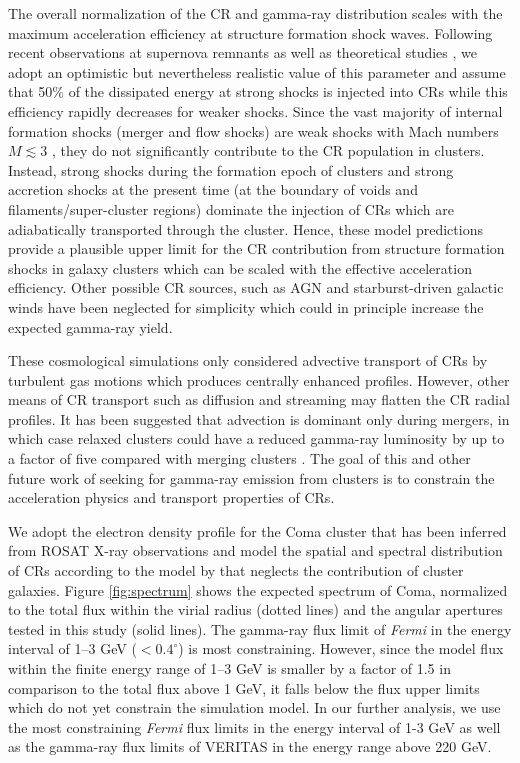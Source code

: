 \documentclass[12pt,manuscript]{aastex}
\begin{document}
The overall normalization of the CR and gamma-ray distribution scales with the maximum acceleration
efficiency at structure formation shock waves. Following recent observations at supernova remnants
\citep{article:Helder_etal:2009} as well as theoretical studies \citep{article:KangJones:2005}, we
adopt an optimistic but nevertheless realistic value of this parameter and assume that 50\% of the
dissipated energy at strong shocks is injected into CRs while this efficiency rapidly decreases for
weaker shocks. Since the vast majority of internal formation shocks (merger and flow shocks) are
weak shocks with Mach numbers $M\lesssim3$ \citep[e.g.,][]{article:Ryu_etal:2003}, they do not
significantly contribute to the CR population in clusters. Instead, strong shocks during the
formation epoch of clusters and strong accretion shocks at the present time (at the boundary of
voids and filaments/super-cluster regions) dominate the injection of CRs which are adiabatically
transported through the cluster. Hence, these model predictions provide a plausible upper limit for
the CR contribution from structure formation shocks in galaxy clusters which can be scaled with the
effective acceleration efficiency. Other possible CR sources, such as AGN and starburst-driven
galactic winds have been neglected for simplicity which could in principle increase the expected
gamma-ray yield.

These cosmological simulations only considered advective transport of CRs by turbulent gas motions
which produces centrally enhanced profiles.  However, other means of CR transport such as diffusion
and streaming may flatten the CR radial profiles. It has been suggested that advection is dominant
only during mergers, in which case relaxed clusters could have a reduced gamma-ray luminosity by up
to a factor of five compared with merging clusters
\citep{article:EnsslinPfrommerMiniatiSubramanian:2011}. The goal of this and other future work of
seeking for gamma-ray emission from clusters is to constrain the acceleration physics and transport
properties of CRs.

We adopt the electron density profile for the Coma cluster that has been inferred from ROSAT X-ray
observations \citep{article:BrielHenryBohringer:1992} and model the spatial and spectral
distribution of CRs according to the model by \citet{article:PinzkePfrommer:2010} that neglects the
contribution of cluster galaxies. Figure \ref{fig:spectrum} shows the expected spectrum of Coma,
normalized to the total flux within the virial radius (dotted lines) and the angular apertures
tested in this study (solid lines). The gamma-ray flux limit of {\em Fermi} in the energy interval
of 1--3 GeV ($<0.4^\circ$) is most constraining. However, since the model flux within the finite
energy range of 1--3 GeV is smaller by a factor of 1.5 in comparison to the total flux above 1 GeV,
it falls below the flux upper limits which do not yet constrain the simulation model. In our
further analysis, we use the most constraining {\em Fermi} flux limits in the energy interval of
1-3 GeV as well as the gamma-ray flux limits of VERITAS in the energy range above 220 GeV.
\end{document}
